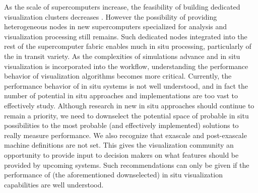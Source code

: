 \begin{refsection}
As the scale of supercomputers increase, the feasibility of building dedicated visualization clusters decreases \cite{Childs07}. However the possibility of providing heterogeneous nodes in new supercomputers specialized for analysis and visualization processing still remains. Such dedicated nodes integrated into the rest of the supercomputer fabric enables much in situ processing, particularly of the in transit variety.
As the complexities of simulations advance and in situ visualization is incorporated into the workflow, understanding the performance behavior of visualization algorithms becomes more critical. Currently, the performance behavior of in situ systems is not well understood, and in fact the number of potential in situ approaches and implementations are too vast to effectively study. Although research in new in situ approaches should continue to remain a priority, we need to downselect the potential space of probable in situ possibilities to the most probable (and effectively implemented) solutions to really measure performance.
We also recognize that exascale and post-exascale machine definitions are not set. This gives the visualization community an opportunity to provide input to decision makers on what features should be provided by upcoming systems. Such recommendations can only be given if the performance of (the aforementioned downselected) in situ visualization capabilities are well understood.


\end{refsection}
